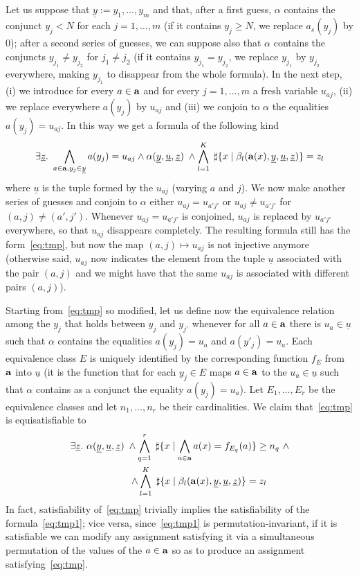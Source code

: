 \documentclass[11pt,a4paper]{article}
\newcommand{\uu}{\ensuremath{\underline u}}
\newcommand{\uy}{\ensuremath{\underline y}}
\newcommand{\uz}{\ensuremath{\underline z}}
\newcommand{\ta}{\ensuremath{{\bf a}}\xspace}
\begin{document}
 Let us suppose that 
 $\uy:=y_1, \dots, y_m$ and that, after a first guess, $\alpha$ contains the conjunct $y_j< N$ for each
 $j=1, \dots, m$ (if it contains $y_j\geq N$,  we replace $a_s(y_j)$ by 0); after a second series of guesses, we can suppose also that
 $\alpha$ contains
 the conjuncts $y_{j_1}\neq y_{j_2}$ for $j_1\neq j_2$ (if it contains $y_{j_1}= y_{j_2}$, we replace $y_{j_1}$ by $y_{j_2}$ everywhere, making $y_{j_1}$ to disappear from the whole formula).
 In the next step, (i) we introduce for every $a\in \ta$ and for every $j=1, \dots, m$ a fresh variable $u_{aj}$, (ii) we replace everywhere $a(y_j)$ by 
 $u_{aj}$ and (iii) we conjoin to $\alpha$ the equalities $a(y_j)=u_{aj}$. In this way we get a formula of the following kind
 \begin{equation}\label{eq:tmp}
   \exists \uz.~\bigwedge_{a\in \ta, y_j\in \uy} a(y_j)=u_{aj} \wedge \alpha(\uy, \uu,\uz)\; \wedge \bigwedge_{l=1}^K\;\sharp\{x\mid \beta_l(\ta(x), \uy,\uu,\uz)\} =z_l 
\end{equation}
where $\uu$ is the tuple formed by the $u_{aj}$ (varying $a$ and $j$). We now make another series of guesses and conjoin to $\alpha$ either 
$u_{aj}=u_{a'j'}$ or $u_{aj}\neq u_{a'j'}$ for $(a,j)\neq (a', j')$. Whenever $u_{aj}=u_{a'j'}$ is conjoined, $u_{aj}$ is replaced by $u_{a'j'}$
everywhere, so that $u_{aj}$ disappears completely. The resulting formula still has the form~\eqref{eq:tmp}, but now the map $(a,j)\mapsto u_{aj}$ is not injective anymore (otherwise said,
 $u_{aj}$ now indicates the element from the tuple $\uu$ associated with the pair $(a,j)$ and we might have that the same $u_{aj}$ is associated 
 with different pairs $(a,j)$). 
 
 Starting from~\eqref{eq:tmp} so modified, let us define now the equivalence relation among the $y_j$ that holds
 between $y_j$ and $y_{j'}$
whenever for all $a\in \ta$ there is $u_a\in \uu$ such that $\alpha$ contains the equalities $a(y_j)=u_a$ and $a(y'_j)=u_a$. Each equivalence class 
$E$ is uniquely identified by the corresponding function $f_E$ from $\ta$ into $\uu$  (it is the function that for each $y_j\in E$ maps $a\in \ta$ to the $u_a\in \uu$ such that $\alpha$ contains 
as a conjunct the equality $a(y_j)=u_a$). Let $E_1, \dots, E_r$ be the equivalence classes and let $n_1, \dots, n_r$ be their cardinalities.
We claim that~\eqref{eq:tmp} is equisatisfiable to
\begin{equation}\label{eq:tmp1}
   \begin{aligned}
   \exists \uz.~ \alpha(\uy, \uu,\uz)\; 
   \wedge \bigwedge_{q=1}^r \;\sharp\{x\mid \bigwedge_{a\in \ta} a(x)=f_{E_q}(a)\}\geq n_q ~\wedge
   \\
   \wedge \bigwedge_{l=1}^K\;\sharp\{x\mid \beta_l(\ta(x), \uy,\uu,\uz)\} =z_l ~~~~~~~
   \end{aligned}
\end{equation}
In fact, satisfiability of~\eqref{eq:tmp} trivially implies the satisfiability of the formula~\eqref{eq:tmp1};
vice versa, since~\eqref{eq:tmp1} is permutation-invariant, if it is satisfiable we can modify any assignment satisfying it via a simultaneous permutation of the values of the $a\in \ta$ so as to produce  an assignment satisfying~\eqref{eq:tmp}.
\end{document}
